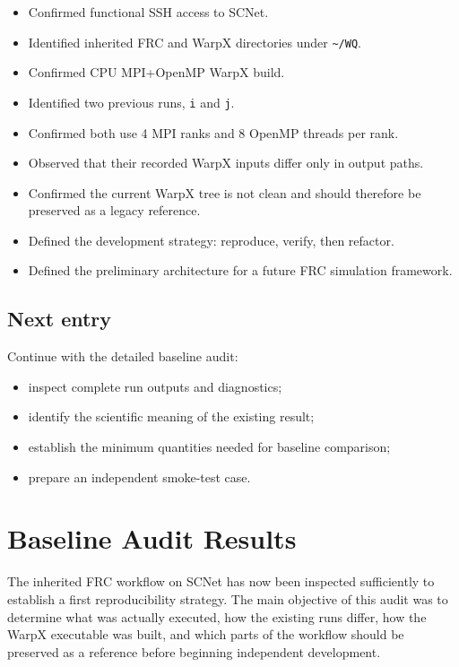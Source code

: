 \documentclass[11pt,a4paper]{article}
\begin{document}
\begin{itemize}
    \item Confirmed functional SSH access to SCNet.
    \item Identified inherited FRC and WarpX directories under \texttt{\textasciitilde/WQ}.
    \item Confirmed CPU MPI+OpenMP WarpX build.
    \item Identified two previous runs, \texttt{i} and \texttt{j}.
    \item Confirmed both use 4 MPI ranks and 8 OpenMP threads per rank.
    \item Observed that their recorded WarpX inputs differ only in output paths.
    \item Confirmed the current WarpX tree is not clean and should therefore be preserved as a legacy reference.
    \item Defined the development strategy: reproduce, verify, then refactor.
    \item Defined the preliminary architecture for a future FRC simulation framework.
\end{itemize}

\subsection*{Next entry}

Continue with the detailed baseline audit:
\begin{itemize}
    \item inspect complete run outputs and diagnostics;
    \item identify the scientific meaning of the existing result;
    \item establish the minimum quantities needed for baseline comparison;
    \item prepare an independent smoke-test case.
\end{itemize}

\section{Baseline Audit Results}

The inherited FRC workflow on SCNet has now been inspected sufficiently to establish a first reproducibility strategy. The main objective of this audit was to determine what was actually executed, how the existing runs differ, how the WarpX executable was built, and which parts of the workflow should be preserved as a reference before beginning independent development.
\end{document}
